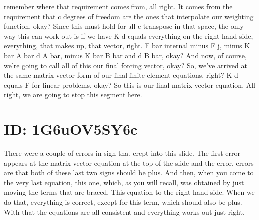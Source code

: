 \documentclass[10pt]{article}
\begin{document}
remember where that requirement comes from, all right. It comes from the requirement that c degrees of freedom are the ones that interpolate our weighting function, okay? Since this must hold for all c transpose in that space, the only way this can work out is if we have K d equals everything on the right-hand side, everything, that makes up, that vector, right. F bar internal minus F j, minus K bar A bar d A bar, minus K bar B bar and d B bar, okay? And now, of course, we're going to call all of this our final forcing vector, okay? So, we've arrived at the same matrix vector form of our final finite element equations, right? K d equals F for linear problems, okay? So this is our final matrix vector equation. All right, we are going to stop this segment here.

\section*{ID: 1G6uOV5SY6c}
There were a couple of errors in sign that crept into this slide. The first error appears at the matrix vector equation at the top of the slide and the error, errors are that both of these last two signs should be plus. And then, when you come to the very last equation, this one, which, as you will recall, was obtained by just moving the terms that are braced. This equation to the right hand side. When we do that, everything is correct, except for this term, which should also be plus. With that the equations are all consistent and everything works out just right.
\end{document}
